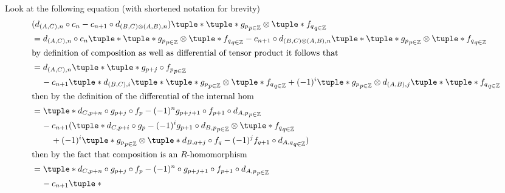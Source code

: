 \begin{remark}
\begin{enumerate}
{            Look at the following equation (with shortened notation for brevity) 
            \begin{align*}
                &( d_{(A, C), n} \circ c_n - c_{n + 1} \circ d_{(B, C) \otimes (A, B), n} )\tuple*{ \tuple*{ g_p }_{p \in \Zb} \otimes \tuple*{ f_q }_{q \in \Zb} } \\
                &= d_{(A, C), n} \circ c_n \tuple*{ \tuple*{ g_p }_{p \in \Zb} \otimes \tuple*{ f_q }_{q \in \Zb} } - c_{n + 1} \circ d_{(B, C) \otimes (A, B), n}\tuple*{ \tuple*{ g_p }_{p \in \Zb} \otimes \tuple*{ f_q }_{q \in \Zb} } \\
                \intertext{by definition of composition as well as differential of tensor product it follows that}
                &= d_{(A, C), n}\tuple*{
                    \tuple*{ g_{p + j} \circ f_p }_{p \in \Zb}
                } \\
                &\hspace{0.4cm} - c_{n + 1} \tuple*{
                    d_{(B, C), i}\tuple*{ \tuple*{ g_p }_{p \in \Zb} } \otimes \tuple*{ f_q }_{q \in \Zb}
                    + (-1)^i \tuple*{ g_p }_{p \in \Zb} \otimes d_{(A, B), j} \tuple*{ \tuple*{ f_q }_{q \in \Zb} }
                } \\
                \intertext{then by the definition of the differential of the internal hom}
                &= \tuple*{
                    d_{C, p + n} \circ g_{p + j} \circ f_p - (-1)^n g_{p + j + 1} \circ f_{p + 1} \circ d_{A, p}
                }_{p \in \Zb} \\
                &\hspace{0.4cm} - c_{n + 1} (
                    \tuple*{
                        d_{C, p + i} \circ g_p - (-1)^i g_{p + 1} \circ d_{B, p}
                    }_{p \in \Zb} \otimes \tuple*{ f_q }_{q \in \Zb} \\
                    &\hspace{0.8cm}+ (-1)^i \tuple*{ g_p }_{p \in \Zb} \otimes \tuple*{
                        d_{B, q + j} \circ f_q - (-1)^j f_{q + 1} \circ d_{A, q}
                    }_{q \in \Zb}
                ) \\
                \intertext{then by the fact that composition is an \( R \)-homomorphism}
                &= \tuple*{
                    d_{C, p + n} \circ g_{p + j} \circ f_p - (-1)^n \circ g_{p + j + 1} \circ f_{p + 1} \circ d_{A, p}
                }_{p \in \Zb} \\
                &\hspace{0.4cm} - c_{n + 1} \tuple*{
}
\end{align*}}
\end{enumerate}
\end{remark}
